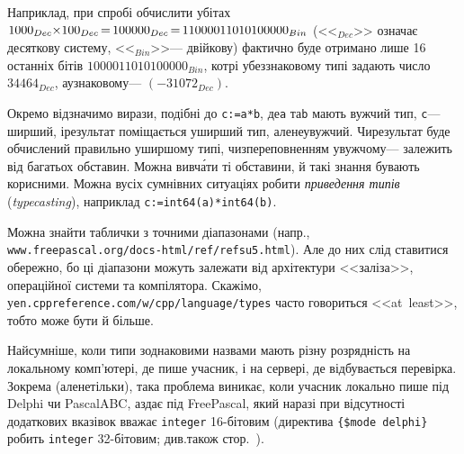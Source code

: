 \documentclass[14pt,a4paper]{extarticle}
\def\dib#1{\,#1\discretionary{}{\mbox{$#1$}}{}\,}
\begin{document}
\label{text:overflow-example}
Наприклад, при спробі обчислити у\nolinebreak[3] бітах $1000_{Dec}{\*}100_{Dec}\dib{{=}}100000_{Dec}\dib{{=}}11000011010100000_{Bin}$ (<<$_{Dec}$>> означає десяткову систему, <<$_{Bin}$>>\nolinebreak[3] --- двійкову) фактично буде отримано лише 16 останніх бітів $1000011010100000_{Bin}$, котрі у\nolinebreak[3] беззнаковому типі задають число $34464_{Dec}$, а\nolinebreak[2] у\nolinebreak[2] знаковому\nolinebreak[3] --- $({-}31072_{Dec})$. 

Окремо відзначимо вирази, подібні до \texttt{c:=a*b}, де\nolinebreak[3] \texttt{a} та\nolinebreak[3] \texttt{b} мають вужчий тип, \texttt{c}\nolinebreak[3] --- ширший, і\nolinebreak[3] результат поміщається у\nolinebreak[2] ширший тип, але\nolinebreak[3] не\nolinebreak[2] у\nolinebreak[3] вужчий. Чи\nolinebreak[3] результат буде обчислений правильно у\nolinebreak[3] ширшому типі, чи\nolinebreak[2] з\nolinebreak[3] переповненням у\nolinebreak[3] вужчому\nolinebreak[3] --- залежить від багатьох обставин. Можна вивч\'{а}ти ті обставини, й такі знання бувають корисними. Можна в\nolinebreak[3] усіх сумнівних ситуаціях робити \emph{приведення типів} (\emph{type\-casting}), наприклад \texttt{c:=int64(a)*int64(b)}.

Можна знайти таблички з точними діапазонами (напр., \verb"www.freepascal."\linebreak[0]\verb"org/"\linebreak[1]\verb"docs-html/"\linebreak[0]\verb"ref/"\linebreak[0]\verb"refsu5.html"). Але до них слід ставитися обережно, бо ці діапазони можуть залежати від архітектури <<заліза>>, операційної системи та компілятора. Скажімо, у\nolinebreak[1] \verb"en.cppreference."\linebreak[0]\verb"com/"\linebreak[1]\verb"w/cpp/"\linebreak[0]\verb"language/"\linebreak[0]\verb"types" часто говориться <<at~least>>, тобто може бути й більше.

Найсумніше, коли типи з\nolinebreak[3] однаковими назвами мають різну розрядність на локальному комп'ютері, де пише учасник, і на сервері, де відбувається перевірка. Зокрема (але\nolinebreak[1] не\nolinebreak[1] тільки), така проблема виникає, коли учасник локально пише під Delphi чи PascalABC, а\nolinebreak[1] здає під Free\nolinebreak[1] Pascal, який наразі при відсут\-ності додаткових вказівок вважає \texttt{integer} 16-\nolinebreak[1]бітовим (директива \verb"{$mode delphi}" робить \texttt{integer} 32-\nolinebreak[1]бітовим; див.\nolinebreak[2] також стор.~\pageref{text:notes-about-delphi-mode}).
\end{document}
